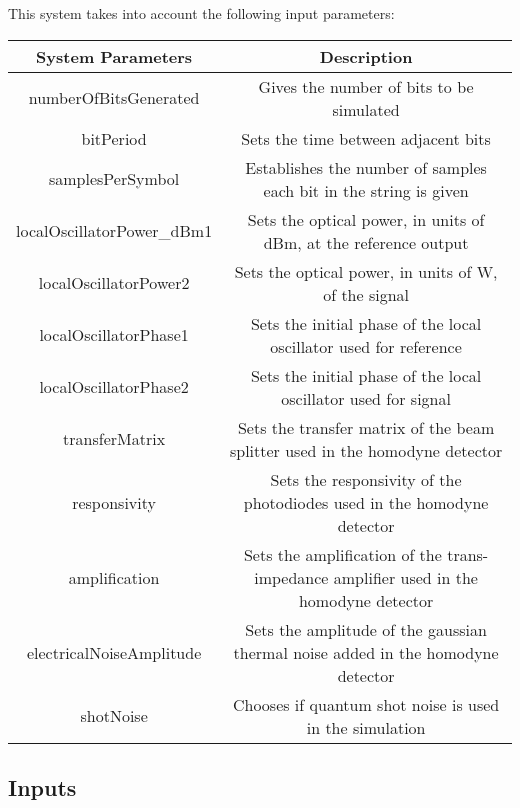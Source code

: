 \documentclass[../../sdf/tex/cv_system]{subfiles}
\begin{document}
This system takes into account the following input parameters:
\begin{table}[H]
\centering
\begin{tabulary}{1.0\textwidth}{|C|C|}
\hline
\textbf{System Parameters} & \textbf{Description}                                                                   \\ \hline
numberOfBitsGenerated      & Gives the number of bits to be simulated                                               \\ \hline
bitPeriod                  & Sets the time between adjacent bits                                                    \\ \hline
samplesPerSymbol           & Establishes the number of samples each bit in the string is given                      \\ \hline
localOscillatorPower\_dBm1 & Sets the optical power, in units of dBm, at the reference output	                      \\ \hline
localOscillatorPower2      & Sets the optical power, in units of W, of the signal                                   \\ \hline
localOscillatorPhase1      & Sets the initial phase of the local oscillator used for reference                      \\ \hline
localOscillatorPhase2      & Sets the initial phase of the local oscillator used for signal                         \\ \hline
transferMatrix             & Sets the transfer matrix of the beam splitter used in the homodyne detector            \\ \hline
responsivity               & Sets the responsivity of the photodiodes used in the homodyne detector                 \\ \hline
amplification              & Sets the amplification of the trans-impedance amplifier used in the homodyne detector  \\ \hline
electricalNoiseAmplitude   & Sets the amplitude of the gaussian thermal noise added in the homodyne detector        \\ \hline
shotNoise                  & Chooses if quantum shot noise is used in the simulation                                \\ \hline
\end{tabulary}
\end{table}		

\subsection{Inputs}
\end{document}
